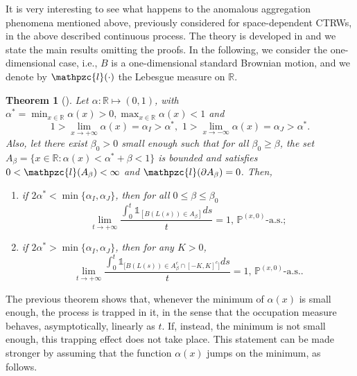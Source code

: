 \documentclass[reqno]{amsart}
\newtheorem{theorem}{Theorem}[section] %
\theoremstyle{remark}
\numberwithin{equation}{section} %
\newcommand{\RR}{\mathbb{R}}
\newcommand{\1}{\mathds{1}}
\begin{document}
	It is very interesting to see what happens to the anomalous aggregation phenomena mentioned above, previously considered for space-dependent CTRWs, in the above described continuous process. The theory is developed in \cite[Section 4]{savtoa} and we state the main results omitting the proofs. In the following, we consider the one-dimensional case, i.e., $B$ is a one-dimensional standard Brownian motion, and we denote by $\mathpzc{l}(\cdot)$ the Lebesgue measure on $\RR$.
	\begin{theorem}[{\cite[Theorem 4.12]{savtoa}}]\label{thm:occupation}
		Let  $\alpha: \mathbb{R}\mapsto (0,1)$, with $\alpha^*=\min_{x\in \mathbb{R}}\alpha(x)>0, \max_{x\in\mathbb{R}}\alpha(x)<1$ and \[1>\lim_{x \to +\infty}\alpha(x)=\alpha_I>\alpha^*,\,\,1>\lim_{x\to -\infty}\alpha(x)=\alpha_J>\alpha^*.\] Also, let there exist $\beta_0>0$ small enough such that for all $\beta_0\geq \beta$, the set $A_\beta=\{x\in\mathbb{R}:\alpha(x)<\alpha^*+\beta<1\}$ is bounded and satisfies $0<\mathpzc{l}({A_\beta})<\infty$ and $\mathpzc{l}(\partial A_\beta)=0$. Then,
		\begin{enumerate}
			\item if $2\alpha^*<\min\{\alpha_I,\alpha_J\}$, then for all $0\leq \beta\leq \beta_0$
			\begin{equation}\label{eq:occupationG}
				\lim_{t \to +\infty}\frac{\int_{0}^{t}\mathds{1}_{[B(L(s))\in A_\beta]}ds}{t}=1,\,\mathds{P}^{(x,0)}\text{-a.s.};
			\end{equation}
			\item  if $2\alpha^*>\min\{ \alpha_I,\alpha_J\}$, then for any $K>0$,
			\begin{equation}\label{eq:occupationG1}
				\lim_{t \to +\infty}\frac{\int_{0}^{t}\mathds{1}_{\big[B(L(s))\in A^c_\beta\cap [-K,K]^c\big]}ds}{t}=1,\,\mathds{P}^{(x,0)}\text{-a.s.}.
			\end{equation}
		\end{enumerate}
	\end{theorem}
	The previous theorem shows that, whenever the minimum of $\alpha (x)$ is small enough, the process is trapped in it, in the sense that the occupation measure behaves, asymptotically, linearly as $t$. If, instead, the minimum is not small enough, this trapping effect does not take place. This statement can be made stronger by assuming that the function $\alpha(x)$ jumps on the minimum, as follows.
\end{document}
